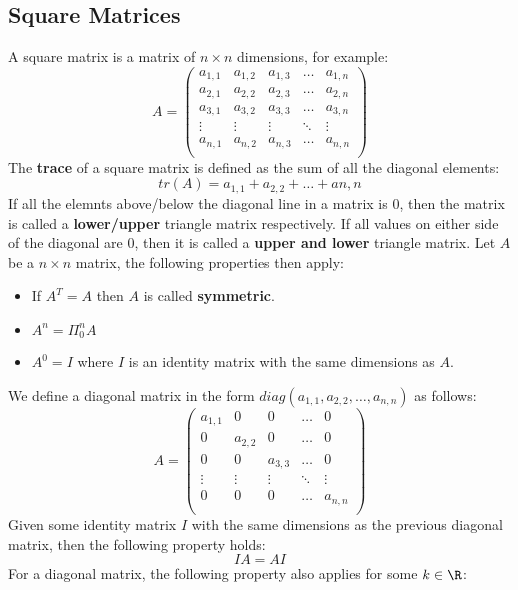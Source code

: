 \documentclass[a4paper]{article}
\begin{document}
  \subsection{Square Matrices}
  A square matrix is a matrix of $n \times n$ dimensions, for example:
  \[
    A = \begin{pmatrix}
      a_{1,1} & a_{1,2} & a_{1,3}& \dots & a_{1,n} \\
      a_{2,1} & a_{2,2} & a_{2,3}&\dots & a_{2,n} \\
      a_{3,1} & a_{3,2} & a_{3,3}&\dots & a_{3,n} \\
      \vdots & \vdots & \vdots&\ddots & \vdots\\
      a_{n,1} & a_{n,2} & a_{n,3}&\dots & a_{n,n} \\
    \end{pmatrix}
  \]
  The \textbf{trace} of a square matrix is defined as the sum of all the diagonal elements:
  \[
    tr(A) = a_{1,1} + a_{2,2} + \dots + a{n,n}
  \]
  If all the elemnts above/below the diagonal line in a matrix is 0, then the matrix is called a \textbf{lower/upper} triangle matrix respectively. If all values on either side of the diagonal are 0, then it is called a \textbf{upper and lower} triangle matrix.
  \newpage
  Let $A$ be a $n\times n $ matrix, the following properties then apply:
  \begin{itemize}
    \item If $A^T = A$ then $A$ is called \textbf{symmetric}.
    \item $A^n = \Pi^n_0 A$ 
    \item $A^0 = I$ where $I$ is an identity matrix with the same dimensions as $A$.
  \end{itemize}
  We define a diagonal matrix in the form $diag(a_{1,1},a_{2,2},\dots,a_{n,n})$ as follows:
  \[
    A = \begin{pmatrix}
      a_{1,1} & 0 & 0& \dots & 0 \\
      0 & a_{2,2} & 0&\dots & 0 \\
      0 & 0 & a_{3,3}&\dots & 0 \\
      \vdots & \vdots & \vdots&\ddots & \vdots\\
      0 & 0 & 0&\dots & a_{n,n} \\
    \end{pmatrix}
  \]
  Given some identity matrix $I$ with the same dimensions as the previous diagonal matrix, then the following property holds:
  \[
    IA = AI
  \]
  For a diagonal matrix, the following property also applies for some $k\in \R$:
\end{document}
